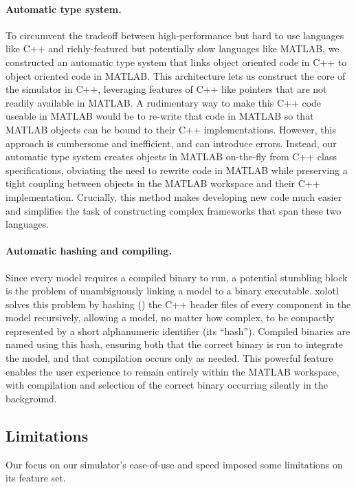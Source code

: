 \documentclass{frontiersSCNS} %
\begin{document}
\paragraph{Automatic type system.}
To circumvent the tradeoff between high-performance but hard to use languages like C++ and richly-featured but potentially slow languages like MATLAB, we constructed an automatic type system that links object oriented code in C++ to object oriented code in MATLAB. This architecture lets us construct the core of the simulator in C++, leveraging features of C++ like pointers that are not readily available in MATLAB. A rudimentary way to make this C++ code useable in MATLAB would be to re-write that code in MATLAB so that MATLAB objects can be bound to their C++ implementations. However, this approach is cumbersome and inefficient, and can introduce errors. Instead, our automatic type system creates objects in MATLAB on-the-fly from C++ class specifications, obviating the need to rewrite code in MATLAB while preserving a tight coupling between objects in the MATLAB workspace and their C++ implementation. Crucially, this method makes developing new code much easier and simplifies the task of constructing complex frameworks that span these two languages.

\paragraph{Automatic hashing and compiling.}
Since every model requires a compiled binary to run, a potential stumbling block is the problem of unambiguously linking a model to a binary executable. xolotl solves this problem by hashing (\cite{rivestMD5MessageDigestAlgorithm1992}) the C++ header files of every component in the model recursively, allowing a model, no matter how complex, to be compactly represented by a short alphanumeric identifier (its ``hash''). Compiled binaries are named using this hash, ensuring both that the correct binary is run to integrate the model, and that compilation occurs only as needed. This powerful feature enables the user experience to remain entirely within the MATLAB workspace, with compilation and selection of the correct binary occurring silently in the background. 


\subsection{Limitations}
\label{limitations}

Our focus on our simulator's ease-of-use and speed imposed some limitations on its feature set. 
\end{document}
